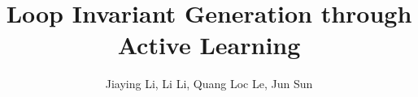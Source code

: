 \documentclass{llncs}
\begin{document}

\title{Loop Invariant Generation through Active Learning}

\author{Jiaying Li, Li Li, Quang Loc Le, Jun Sun}



\maketitle
\end{document}
